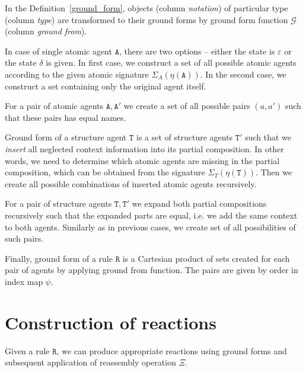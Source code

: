\documentclass[12pt, twoside]{fithesis2} %
\begin{document}
In the Definition~\ref{ground_form}, objects (column \emph{notation}) of particular type (column \emph{type}) are transformed to their ground forms by ground form function $\mathcal{G}$ (column \emph{ground from}).

In case of single atomic agent $\mathtt{A}$, there are two options -- either the state is $\varepsilon$ or the state $\delta$ is given. In first case, we construct a set of all possible atomic agents according to the given atomic signature $\Sigma_A(\eta(\mathtt{A}))$. In the second case, we construct a set containing only the original agent itself.

For a pair of atomic agents $\mathtt{A}, \mathtt{A}'$ we create a set of all possible pairs $(a, a')$ such that these pairs has equal names.

Ground form of a structure agent $\mathtt{T}$ is a set of structure agents $\mathtt{T}'$ such that we \emph{insert} all neglected context information into its partial composition. In other words, we need to determine which atomic agents are missing in the partial composition, which can be obtained from the signature $\Sigma_T(\eta(\mathtt{T}))$. Then we create all possible combinations of inserted atomic agents recursively.

For a pair of structure agents $\mathtt{T}, \mathtt{T}'$ we expand both partial compositions recursively such that the expanded parts are equal, i.e. we add the same context to both agents. Similarly as in previous cases, we create set of all possibilities of such pairs.

Finally, ground form of a rule $\mathtt{R}$ is a Cartesian product of sets created for each pair of agents by applying ground from function. The pairs are given by order in index map $\psi$.

\section{Construction of reactions}
\label{Generating reactions}

Given a rule $\mathtt{R}$, we can produce appropriate reactions using ground forms and subsequent application of reassembly operation $\Xi$.
\end{document}

